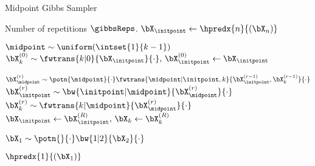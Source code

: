 \begin{algorithm}[t]
    \caption{Midpoint Gibbs Sampler}
    \begin{algorithmic}[1]
         Number of repetitions $\gibbsReps$. 
         $\bX_{\initpoint} \gets \hpredx{n}{(\bX_n)}$

             $\midpoint \sim \uniform(\intset{1}{k-1})$
             $\bX^{(0)}_k \sim \fwtrans{k|0}{\bX_{\initpoint}}{\cdot}, \, \bX^{(0)}_{\initpoint} \gets \bX_{\initpoint}$

                \STATE $\bX^{(r)}_\midpoint \sim \potn{\midpoint}{\cdot} \fwtrans{\midpoint|\initpoint, k}{\bX^{(r-1)}_\initpoint, \bX^{(r-1)}_k}{\cdot}$
                \STATE $\bX^{(r)}_\initpoint \sim \bw{\initpoint|\midpoint}{\bX^{(r)}_{\midpoint}}{\cdot}$
                \STATE $\bX^{(r)}_k \sim \fwtrans{k|\midpoint}{\bX^{(r)}_{\midpoint}}{\cdot}$
            \ENDFOR
            \STATE $\bX_{\initpoint} \gets \bX^{(R)}_{\initpoint}, \,\bX_{k} \gets \bX^{(R)}_{k}$
        \ENDFOR

        \STATE $\bX_1 \sim \potn{}{\cdot} \bw{1|2}{\bX_2}{\cdot}$

         $\hpredx{1}{(\bX_1)}$
    \end{algorithmic}
    \label{algo:midpoint-gibbs}
\end{algorithm}
